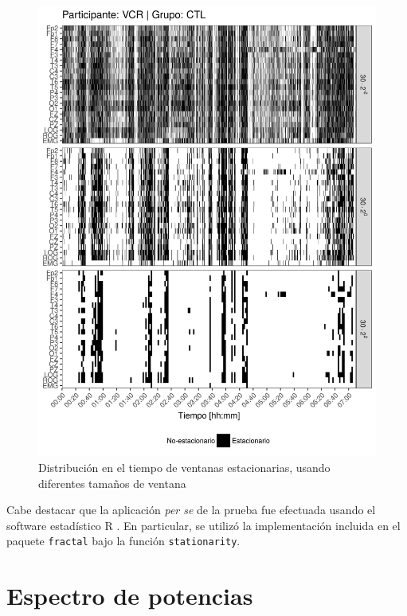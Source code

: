 \begin{figure}
\centering
\includegraphics[width=\linewidth]
{./img_art_dfa/VCNNS1_comp_est_.png}
\caption{Distribución en el tiempo de ventanas estacionarias, usando diferentes tamaños
de ventana}
\label{comp_VCR}
\end{figure}

Cabe destacar que la aplicación \textit{per se} de la prueba fue efectuada usando el software 
estadístico R \cite{R_citar}. En particular, se utilizó la implementación 
incluida en el paquete \texttt{fractal} \cite{R_fractal} bajo la función \texttt{stationarity}.


\section{Espectro de potencias}

